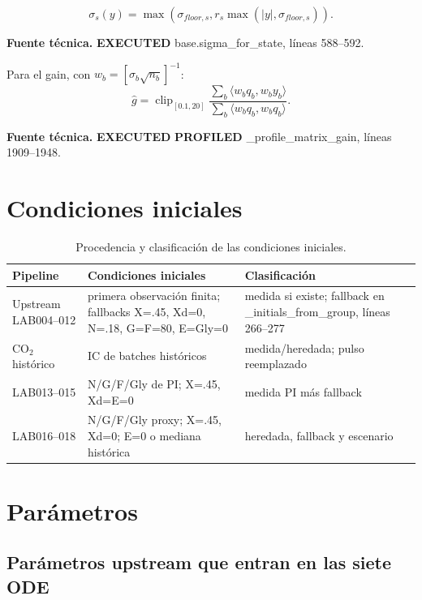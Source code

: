 \documentclass[11pt]{article}
\newcommand{\E}[1]{%
  \nobreak\hspace{0.16em}%
  \begingroup
  \setlength{\fboxsep}{1.5pt}%
  \colorbox{auditpale}{\textcolor{auditblue}{\sffamily\bfseries\scriptsize #1}}%
  \endgroup\hspace{0.16em}%
}
\newcommand{\code}[1]{{\small\ttfamily #1}}
\newcommand{\sourceinfo}[1]{%
  \par\vspace{-0.15em}%
  {\small\color{auditslate}\sffamily\textbf{Fuente técnica.}\enspace #1\par}%
  \vspace{0.25em}%
}
\newcommand{\tablehead}[1]{\textcolor{auditblue}{\sffamily\bfseries #1}}
\DeclareMathOperator{\clip}{clip}
\begin{document}
\begin{equation}
\sigma_s(y)=\max(\sigma_{floor,s},r_s\max(|y|,\sigma_{floor,s})). \tag{R74}
\end{equation}
\sourceinfo{\E{EXECUTED} \code{base.sigma\_for\_state}, líneas 588--592.}

Para el gain, con $w_b=[\sigma_b\sqrt{n_b}]^{-1}$:
\begin{equation}
\hat g=\clip_{[0.1,20]}
\frac{\sum_b\langle w_bq_b,w_by_b\rangle}
{\sum_b\langle w_bq_b,w_bq_b\rangle}. \tag{R75}
\end{equation}
\sourceinfo{\E{EXECUTED}\E{PROFILED} \code{\_profile\_matrix\_gain},
líneas 1909--1948.}

\section{Condiciones iniciales}

\begin{table}[H]
\centering
\caption{Procedencia y clasificación de las condiciones iniciales.}
\label{tab:condiciones-iniciales}
\begin{tabularx}{\textwidth}{>{\raggedright\arraybackslash}p{}YY}
\toprule
\tablehead{Pipeline} & \tablehead{Condiciones iniciales} & \tablehead{Clasificación} \\
\midrule
Upstream LAB004--012 & primera observación finita; fallbacks X=.45, Xd=0,
N=.18, G=F=80, E=Gly=0 & medida si existe; fallback en
\code{\_initials\_from\_group}, líneas 266--277 \\
CO$_2$ histórico & IC de batches históricos & medida/heredada; pulso reemplazado \\
LAB013--015 & N/G/F/Gly de PI; X=.45, Xd=E=0 & medida PI más fallback \\
LAB016--018 & N/G/F/Gly proxy; X=.45, Xd=0; E=0 o mediana histórica & heredada,
fallback y escenario \\
\bottomrule
\end{tabularx}
\end{table}

\section{Parámetros}

\subsection{Parámetros upstream que entran en las siete ODE}
\end{document}
